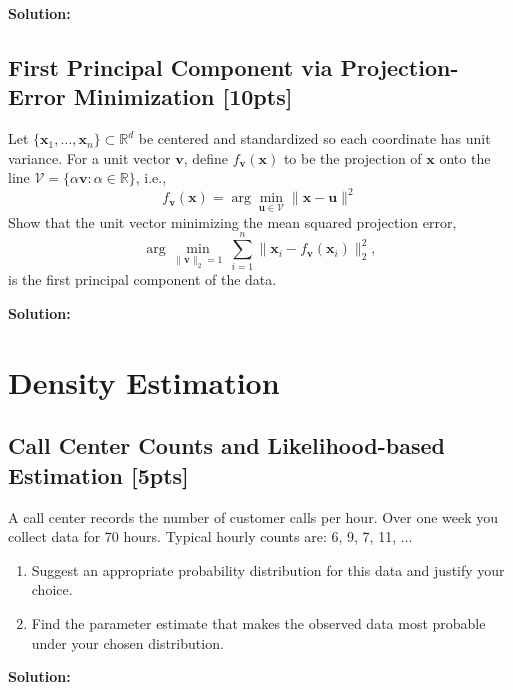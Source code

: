 \documentclass[11pt,epic]{article}
\newenvironment{solution}
  {\par\medskip
  \color{gray}%
   \begin{framed}
   \textbf{Solution: \newline}\ignorespaces}
 {\end{framed}
  \medskip}
\begin{document}
\begin{solution}

\end{solution}


\subsection{First Principal Component via Projection-Error Minimization [10pts]} 

Let $\{\mathbf{x}_1,\ldots,\mathbf{x}_n\}\subset\mathbb{R}^d$ be centered and standardized so each coordinate has unit variance. For a unit vector $\mathbf{v}$, define $f_{\mathbf{v}}(\mathbf{x})$ to be the projection of $\mathbf{x}$ onto the line $\mathcal{V}=\{\alpha\mathbf{v}:\alpha\in\mathbb{R}\}$, i.e.,
\[
f_{\mathbf{v}}(\mathbf{x})=\arg\min_{\mathbf{u}\in\mathcal{V}}\|\mathbf{x}-\mathbf{u}\|^2
\]
Show that the unit vector minimizing the mean squared projection error,
\[
\arg\min_{\|\mathbf{v}\|_2=1}\ \sum_{i=1}^n \bigl\|\mathbf{x}_i - f_{\mathbf{v}}(\mathbf{x}_i)\bigr\|_2^2,
\]
is the first principal component of the data.


\begin{solution}

\end{solution}

\section{Density Estimation}
\subsection{Call Center Counts and Likelihood-based Estimation [5pts]}  

A call center records the number of customer calls per hour. Over one week you collect data for 70 hours. Typical hourly counts are: 6, 9, 7, 11, $\ldots$  

\begin{enumerate}
    \item Suggest an appropriate probability distribution for this data and justify your choice.  
    \item Find the parameter estimate that makes the observed data most probable under your chosen distribution.  
\end{enumerate}  

\begin{solution}

\end{solution}  
\end{document}
